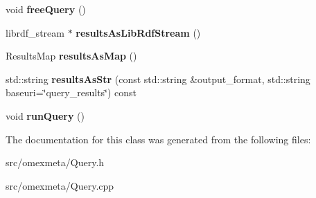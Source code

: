 \begin{DoxyCompactItemize}
void {\bfseries free\+Query} ()
\item 
\mbox{\label{classomexmeta_1_1Query_a0dda4502056d712d351f7057329c7688}} 
librdf\+\_\+stream $\ast$ {\bfseries results\+As\+Lib\+Rdf\+Stream} ()
\item 
\mbox{\label{classomexmeta_1_1Query_ab50cc5f76dcf7f863f9fa9d0bf755071}} 
Results\+Map {\bfseries results\+As\+Map} ()
\item 
\mbox{\label{classomexmeta_1_1Query_a7109dd08bd808bf5a20becb164622ed6}} 
std\+::string {\bfseries results\+As\+Str} (const std\+::string \&output\+\_\+format, std\+::string baseuri=\char`\"{}query\+\_\+results\char`\"{}) const
\item 
\mbox{\label{classomexmeta_1_1Query_a879a4db0413abc8f4a3470877ebf5193}} 
void {\bfseries run\+Query} ()
\end{DoxyCompactItemize}


The documentation for this class was generated from the following files\+:\begin{DoxyCompactItemize}
\item 
src/omexmeta/Query.\+h\item 
src/omexmeta/Query.\+cpp\end{DoxyCompactItemize}
